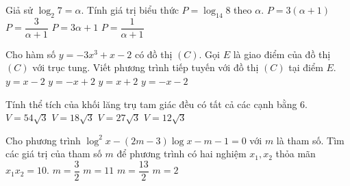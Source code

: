 \begin{ex}%
Giả sử $ \log_2 7=\alpha. $ Tính giá trị biểu thức $ P=\log_{14}8 $ theo $ \alpha $.
\choice
{$ P=3(\alpha+1) $}
{\True $ P=\dfrac{3}{\alpha+1} $}
{$ P=3\alpha+1 $}
{$ P=\dfrac{1}{\alpha+1} $}
\end{ex}
\begin{ex}%
Cho hàm số $ y=-3x^3+x-2 $ có đồ thị $ (C) $. Gọi $ E $ là giao điểm của đồ thị $ (C) $ với trục tung. Viết phương trình tiếp tuyến với đồ thị $ (C) $ tại điểm $ E $.
	\choice
	{\True $ y=x-2 $}
	{$ y=-x+2 $}
	{$ y=x+2 $}
	{$ y=-x-2 $}
\end{ex}
\begin{ex}%
Tính thể tích của khối lăng trụ tam giác đều có tất cả các cạnh bằng 6.	
	\choice
	{\True $ V=54\sqrt{3} $}
	{$ V=18\sqrt{3} $}
	{$ V=27\sqrt{3} $}
	{$ V=12\sqrt{3} $}
\end{ex}
\begin{ex}%
Cho phương trình $ \log^2 x-(2m-3)\log x-m-1=0 $ với $ m $ là tham số. Tìm các giá trị của tham số $ m $ để phương trình có hai nghiệm $ x_1,x_2 $ thỏa mãn $ x_1x_2=10 $.
	\choice
	{$ m=\dfrac{3}{2} $}
	{$ m=11 $}
	{$ m=\dfrac{13}{2} $}
	{\True $ m=2 $}
\end{ex}
